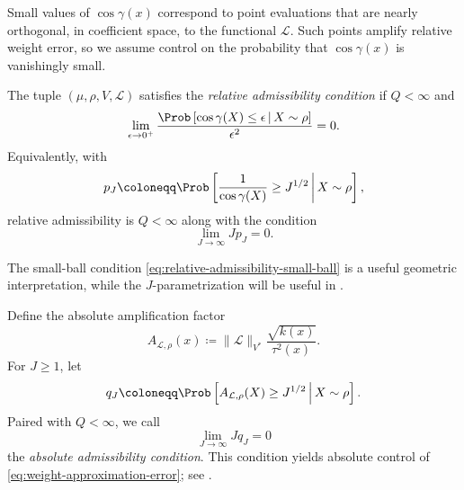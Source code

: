 \documentclass[10pt,dvipsnames]{amsart}
\begin{document}
Small values of \(\cos\gamma(x)\) correspond to point evaluations that are
nearly orthogonal, in coefficient space, to the functional
\(\mathcal L\). Such points amplify relative weight error, so we assume control on the probability that $\cos \gamma(x)$ is vanishingly small.

\begin{definition}
\label{ass:relative-admissibility}
The tuple \((\mu,\rho,V,\mathcal L)\) satisfies the
\emph{relative admissibility condition} if \(Q<\infty\) and
\begin{equation}
\label{eq:relative-admissibility-small-ball}
    \lim_{\epsilon\to0^+}
    \frac{
        \Prob\left[
            \cos\gamma(X)\leq\epsilon
            \,\middle|\,
            X\sim\rho
        \right]
    }{\epsilon^2}
    =
    0.
\end{equation}
Equivalently, with
\begin{equation}
\label{eq:relative-amplification-tail}
    p_J
    \coloneqq
    \Prob\left[
        \frac{1}{\cos\gamma(X)} \ge J^{1/2}
        \,\middle|\,
        X\sim\rho
    \right],
\end{equation}
relative admissibility is $Q < \infty$ along with the condition
\begin{equation}
\label{eq:relative-admissibility}
    \lim_{J\to\infty}Jp_J=0.
\end{equation}
\end{definition}
The small-ball condition \eqref{eq:relative-admissibility-small-ball} is a useful geometric interpretation, while the \(J\)-parametrization will be useful in .

\begin{remark}
\label{rem:absolute-admissibility}
Define the absolute amplification factor
\begin{equation}
\label{eq:absolute-amplification}
    A_{\mathcal L, \rho}(x)
    \coloneqq
    \|\mathcal L\|_{V^*}
    \frac{\sqrt{k(x)}}{\tau^2(x)}.
\end{equation}
For \(J\geq1\), let
\[
    q_J
    \coloneqq
    \Prob\left[
        A_{\mathcal L, \rho}(X)\geq J^{1/2}
        \,\middle|\,
        X\sim\rho
    \right].
\]
Paired with $Q < \infty$, we call
\begin{equation}
\label{eq:absolute-admissibility}
    \lim_{J\to\infty}Jq_J=0
\end{equation}
the \emph{absolute admissibility condition}.  
This condition yields absolute
control of \eqref{eq:weight-approximation-error}; see
. 

\end{remark}
\end{document}
